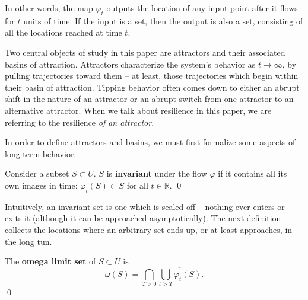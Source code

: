 In other words, the map $\varphi_t$ outputs the location of any input point after it flows for $t$ units of time. If the input is a set, then the output is also a set, consisting of all the locations reached at time $t$.

Two central objects of study in this paper are attractors and their associated basins of attraction. Attractors characterize the system's behavior as $t \to \infty$, by pulling trajectories toward them -- at least, those trajectories which begin within their basin of attraction. Tipping behavior often comes down to either an abrupt shift in the nature of an attractor or an abrupt switch from one attractor to an alternative attractor. When we talk about resilience in this paper, we are referring to the resilience \textit{of an attractor}. 

In order to define attractors and basins, we must first formalize some aspects of long-term behavior.

\begin{definition}
	Consider a subset $S \subset U$. 
	$S$ is \textbf{invariant} under the flow $\varphi$ if it contains all its own images in time: $\varphi_t(S) \subset S$ for all $t \in \mathbb{R}$.
	\qed
\end{definition}

Intuitively, an invariant set is one which is sealed off -- nothing ever enters or exits it (although it can be approached asymptotically). %
The next definition collects the locations where an arbitrary set ends up, or at least approaches, in the long tun. 

\begin{definition}
	The \textbf{omega limit set} of $S \subset U$ is $$\omega(S)
	= \bigcap \limits_{T > 0} \overline{ \bigcup\limits_{t > T} \varphi_t(S) }.$$ \qed
\end{definition}


